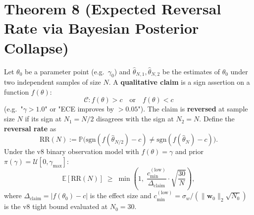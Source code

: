 %
%

\section*{Theorem 8 (Expected Reversal Rate via Bayesian Posterior Collapse)}

\begin{theorem}
\label{thm:T8}
Let $\theta_0$ be a parameter point (e.g.\ $\gamma_0$) and
$\hat\theta_{N,1}, \hat\theta_{N,2}$ be the estimates of $\theta_0$ under two
independent samples of size $N$. A \textbf{qualitative claim} is a sign
assertion on a function $f(\theta)$:
\[
  \mathcal{C}: f(\theta) > c \quad \text{or} \quad f(\theta) < c
\]
(e.g.\ "$\gamma > 1.0$" or "ECE improves by $> 0.05$"). The claim is
\textbf{reversed} at sample size $N$ if its sign at $N_1 = N/2$ disagrees with
the sign at $N_2 = N$. Define the \textbf{reversal rate} as
\[
  \mathrm{RR}(N) := \mathbb{P}\bigl(
    \mathrm{sgn}(f(\hat\theta_{N/2}) - c) \ne \mathrm{sgn}(f(\hat\theta_N) - c)
  \bigr).
\]
Under the v8 binary observation model with $f(\theta) = \gamma$ and prior
$\pi(\gamma) = \mathcal{U}[0, \gamma_{\max}]$:
\[
  \mathbb{E}[\mathrm{RR}(N)]
    \;\ge\; \min\!\left(
      1,\;
      \frac{c_{\min}^{(\mathrm{low})}}{\Delta_{\mathrm{claim}}} \cdot \sqrt{\frac{30}{N}}
    \right),
\tag{RR}
\]
where $\Delta_{\mathrm{claim}} = |f(\theta_0) - c|$ is the effect size and
$c_{\min}^{(\mathrm{low})} = \sigma_w / (\|\mathbf{w}_0\|_2 \sqrt{N_0})$ is
the v8 tight bound evaluated at $N_0 = 30$.
\end{theorem}


